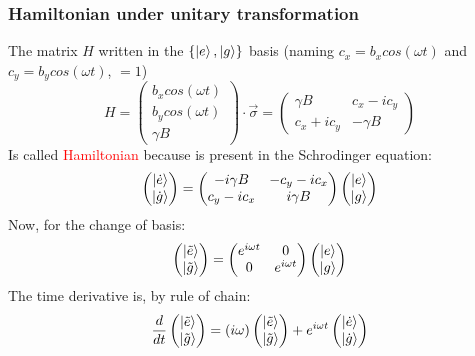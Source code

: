 \documentclass{article}
\begin{document}
\subsubsection{Hamiltonian under unitary transformation}
The matrix $H$ written in the $\{\ket{e},\ket{g}\}$ basis (naming $c_x=b_x cos(\omega t)$ and $c_y=b_y cos(\omega t)$, $=1$)
\begin{equation}\label{eq1}H=\begin{pmatrix} b_x cos(\omega t) \\ b_y cos(\omega t) \\ \gamma B \end{pmatrix}\cdot\vec{\sigma}=\begin{pmatrix}\gamma B & c_x-ic_y\\ c_x+ic_y & -\gamma B \end{pmatrix}\end{equation}
Is called \textcolor{red}{Hamiltonian} because is present in the Schrodinger equation:
\begin{equation}\label{eq2}\begin{pmatrix} \ket{\dot{e}}\\ \ket{\dot{g}} \end{pmatrix}= \begin{pmatrix}-i\gamma B & -c_y-ic_x\\ c_y-ic_x & i\gamma B \end{pmatrix}
\begin{pmatrix} \ket{e}\\ \ket{g} \end{pmatrix}\end{equation}
Now, for the change of basis:
\begin{equation}\label{eq3}\begin{pmatrix} \ket{\tilde{e}}\\ \ket{\tilde{g}} \end{pmatrix}= \begin{pmatrix}e^{i\omega t} & 0 \\ 0 & e^{i\omega t}\end{pmatrix}
\begin{pmatrix} \ket{e}\\ \ket{g} \end{pmatrix}\end{equation}
The time derivative is, by rule of chain:
\begin{equation}\label{eq4}\frac{d}{dt} \begin{pmatrix} \ket{\tilde{e}}\\ \ket{\tilde{g}} \end{pmatrix}=(i\omega )\begin{pmatrix} \ket{\tilde{e}}\\ \ket{\tilde{g}} \end{pmatrix}+ e^{i\omega t}\begin{pmatrix} \ket{\dot{e}}\\ \ket{\dot{g}} \end{pmatrix}\end{equation}
\end{document}
